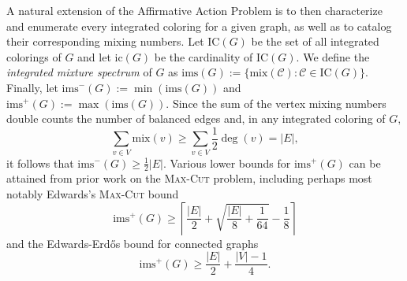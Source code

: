\documentclass[11pt, reqno]{amsart}
\theoremstyle{definition}
\renewcommand{\geq}{\geqslant}
\begin{document}
A natural extension of the Affirmative Action Problem is to then characterize and enumerate every integrated coloring for a given graph, as well as to catalog their corresponding mixing numbers. Let $\text{IC}(G)$ be the set of all integrated colorings of $G$ and let $\text{ic}(G)$ be the cardinality of $\text{IC}(G).$ We define the \textit{integrated mixture spectrum} of $G$ as $\text{ims}(G) := \{\text{mix}(\mathcal{C}): \mathcal{C} \in \text{IC}(G)\}.$ Finally, let $\text{ims}^-(G) := \min(\text{ims}(G))$ and $\text{ims}^+(G) := \max(\text{ims}(G)).$ Since the sum of the vertex mixing numbers double counts the number of balanced edges and, in any integrated coloring of $G,$
\begin{equation}
\sum_{v \in V} \text{mix}(v) \geq\sum_{v \in V} \frac{1}{2}\deg(v) = |E|,
\end{equation}
it follows that $\text{ims}^-(G) \geq \frac{1}{2}|E|.$ Various lower bounds for $\text{ims}^+(G)$ can be attained from prior work on the \textsc{Max-Cut} problem, including perhaps most notably Edwards's \textsc{Max-Cut} bound \cite{Edwards2}
\begin{equation}
    \text{ims}^+(G) \geq \left\lceil\frac{|E|}{2} + \sqrt{\frac{|E|}{8} + \frac{1}{64}} - \frac{1}{8} \right\rceil
\end{equation}
and the Edwards-Erd\H{o}s bound for connected graphs \cite{Edwards1}
\begin{equation}
    \text{ims}^+(G) \geq \frac{|E|}{2} + \frac{|V|-1}{4}.
\end{equation}
\end{document}
